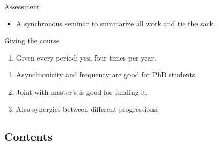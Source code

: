 \begin{frame}
  \begin{block}{Assessment}
    \begin{itemize}
      \item A synchronous seminar to summarize all work and tie the sack.
    \end{itemize}
  \end{block}
\end{frame}

\begin{frame}
  \begin{block}{Giving the course}
    \begin{enumerate}
      \item Given every period; yes, four times per year.
    \end{enumerate}
  \end{block}

  \pause

  \begin{remark}
    \begin{enumerate}
      \item Asynchronicity and frequency are good for PhD students.
      \item Joint with master's is good for funding it.
      \item Also synergies between different progressions.
    \end{enumerate}
  \end{remark}
\end{frame}

\subsection{Contents}

